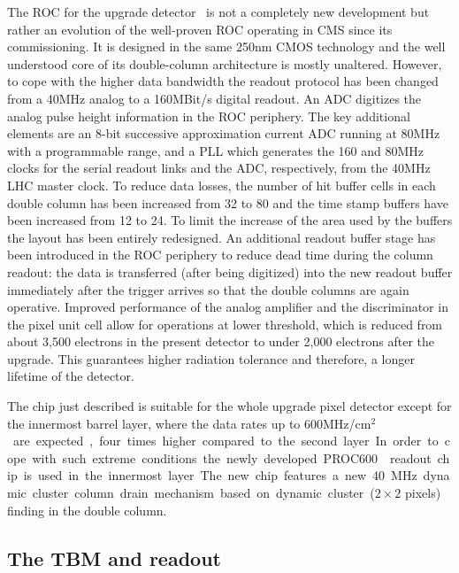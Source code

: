 The ROC for the upgrade detector~\cite{Kastli201388} is not a completely new development but rather an evolution of the well-proven ROC operating in CMS since its commissioning.
It is designed in the same 250\unit{nm} CMOS technology and the well understood core of its double-column architecture is mostly unaltered.
However, to cope with the higher data bandwidth the readout protocol has been changed from a 40\unit{MHz} analog to a 160\unit{MBit/s} digital readout. An ADC digitizes the analog pulse height information in the ROC periphery.
The key additional elements are an 8-bit successive approximation current ADC running at 80\unit{MHz} with a programmable range, and a PLL which generates the 160 and 80\unit{MHz} clocks for the serial readout links and the ADC, respectively, from the 40\unit{MHz} LHC master clock.
To reduce data losses, the number of hit buffer cells in each double column has been increased from 32 to 80 and the time stamp buffers have been increased from 12 to 24.
To limit the increase of the area used by the buffers the layout has been entirely redesigned.
An additional readout buffer stage has been introduced in the ROC periphery to reduce dead time during the column readout: the data is transferred (after being digitized) into the new readout buffer immediately after the trigger arrives so that the double columns are again operative.
Improved performance of the analog amplifier and the discriminator in the pixel unit cell allow for operations at lower threshold, which is reduced from about 3,500 electrons in the present detector to under 2,000 electrons after the upgrade. This guarantees higher radiation tolerance and therefore, a longer lifetime of the detector.

The chip just described is suitable for the whole upgrade pixel detector except for the innermost barrel layer, where the data rates up to 600\unit{MHz/cm$^2$} are expected, four times higher compared to the second layer.
In order to cope with such extreme conditions the newly developed PROC600~\cite{Starodumov:2227967} readout chip is used in the innermost layer. The new chip features a new 40\unit{MHz} dynamic cluster column drain mechanism based on dynamic cluster ($2\times2$ pixels) finding in the double column.

\subsection{The TBM and readout}\label{subsec:Phase1TBM}

